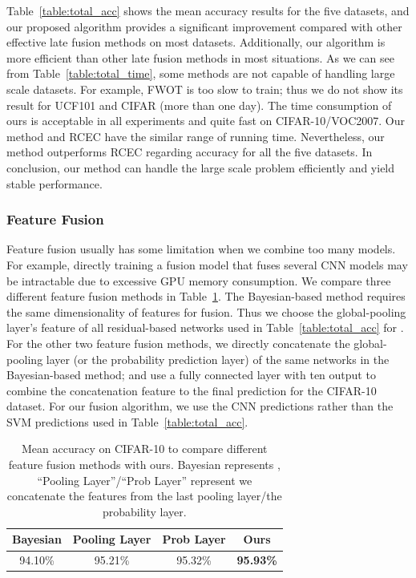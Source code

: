 \documentclass[letterpaper]{article} %
\begin{document}
Table~\ref{table:total_acc} shows the mean accuracy results for the five datasets, and our proposed algorithm provides a significant improvement compared with other effective late fusion methods on most datasets.
Additionally, our algorithm is more efficient than other late fusion methods in most situations.
As we can see from Table~\ref{table:total_time}, some methods are not capable of handling large scale datasets.
For example, FWOT is too slow to train; thus we do not show its result for UCF101 and CIFAR (more than one day).
The time consumption of ours is acceptable in all experiments and quite fast on CIFAR-10/VOC2007.
Our method and RCEC have the similar range of running time. Nevertheless, our method outperforms RCEC regarding accuracy for all the five datasets.
In conclusion, our method can handle the large scale problem efficiently and yield stable performance.

\subsubsection{Feature Fusion}
Feature fusion usually has some limitation when we combine too many models. For example, directly training a fusion model that fuses several CNN models may be intractable due to excessive GPU memory consumption.
We compare three different feature fusion methods in Table~\ref{table:feature}.
The Bayesian-based method \cite{chen2012bayesian} requires the same dimensionality of features for fusion.
Thus we choose the global-pooling layer's feature of all residual-based networks used in Table~\ref{table:total_acc} for \cite{chen2012bayesian}.
For the other two feature fusion methods, we directly concatenate the global-pooling layer (or the probability prediction layer) of the same networks in the Bayesian-based method; and use a fully connected layer with ten output to combine the concatenation feature to the final prediction for the CIFAR-10 dataset.
For our fusion algorithm, we use the CNN predictions rather than the SVM predictions used in Table~\ref{table:total_acc}.

\begin{table}[t]
\centering
\begin{tabular}{|c|c|c|c|}
\hline
   Bayesian  & Pooling Layer & Prob Layer   & \bf{Ours}     \\\hline
    94.10\%  & 95.21\%       &   95.32\%    & \bf{95.93\%}  \\
\hline
\end{tabular}
\caption{Mean accuracy on CIFAR-10 to compare different feature fusion methods with ours. Bayesian represents \cite{chen2012bayesian}, ``Pooling Layer''/``Prob Layer'' represent we concatenate the features from the last pooling layer/the probability layer.}
\label{table:feature}
\end{table}
\end{document}
